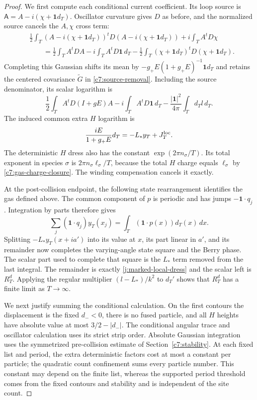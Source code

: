 \begin{proof}
We first compute each conditional current coefficient. Its loop
source is
$\mathsf A=A-i(\chi+\mathbf1d_T)$. Oscillator curvature gives
$D$ as before, and the normalized source cancels the $A,\chi$
cross term:
\[
\begin{aligned}
 &\frac12\int_T
 (A-i(\chi+\mathbf1d_T))^tD(A-i(\chi+\mathbf1d_T))
       +i\int_T A^tD\chi\\
 &\qquad=\frac12\int_T A^tDA-i\int_T A^tD\mathbf1\,d_T
        -\frac12\int_T(\chi+\mathbf1d_T)^tD(\chi+\mathbf1d_T).
\end{aligned}
\]
Completing this Gaussian shifts its mean by
$-g_+E(1+g_+E)^{-1}\mathbf1d_T$ and retains the centered
covariance $\widetilde G$ in \eqref{c7:source-removal}. Including
the source denominator, its scalar logarithm is
\[
 \frac12\int_T A^tD(I+gE)A-i\int_T A^tD\mathbf1\,d_T
 -\frac{|\mathbf1|^2}{4\pi}\int_Td_T l\,d_T.
\]
The induced common extra $H$ logarithm is
\[
 \frac{iE}{1+g_+E}d_T=-L_*y_T+J_T^{\rm loc}.
\]
The deterministic $H$ dress also has the constant
$\exp(2\pi n_\sigma/T)$. Its total exponent in species $\sigma$
is $2\pi n_\sigma\ell_\sigma/T$, because the total $H$ charge
equals $\ell_\sigma$ by \eqref{c7:gas-charge-closure}.
The winding compensation cancels it exactly.

At the post-collision endpoint, the following state rearrangement
identifies the gas defined above. The common component of $p$ is
periodic and has jumps
$-\mathbf1\cdot q_j$. Integration by parts therefore gives
\[
 \sum_j(\mathbf1\cdot q_j)y_T(x_j)
 =\int_T(\mathbf1\cdot p(x))d_T(x)\,dx.
\]
Splitting $-L_*y_T(x+ia')$ into its value at $x$, its part
linear in $a'$, and its remainder now completes the varying-angle
state square and the Berry phase. The scalar part used to complete
that square is the $L_*$ term removed from the last integral.
The remainder is exactly \eqref{j:marked-local-dress} and the
scalar left is $R_T^d$. Applying the regular multiplier
$(l-L_*)/k^2$ to $d_T'$ shows that $R_T^d$ has a finite limit as
$T\to\infty$.

We next justify summing the conditional calculation. On the first
contours the displacement is the fixed $d_-<0$, there is no
fused particle, and all $H$ heights have absolute value at most
$3/2-|d_-|$. The conditional angular trace and oscillator
calculation uses its strict strip order. Absolute Gaussian
integration uses the symmetrized pre-collision estimate of
Section~\ref{c7:stability}. At each fixed list and period, the
extra deterministic factors cost at most a constant per particle;
the quadratic count confinement sums every particle number. This
constant may depend on the finite list, whereas the supported
period threshold comes from the fixed contours and stability and
is independent of the site count.


\end{proof}
